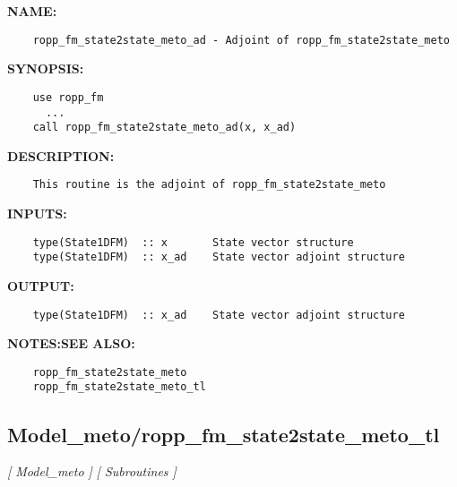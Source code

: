 \label{ch:robo62}
\label{ch:Model_meto_ropp_fm_state2state_meto_ad}
\textbf{NAME:}\hspace{0.08in}\begin{Verbatim}
    ropp_fm_state2state_meto_ad - Adjoint of ropp_fm_state2state_meto
\end{Verbatim}
\textbf{SYNOPSIS:}\hspace{0.08in}\begin{Verbatim}
    use ropp_fm
      ...
    call ropp_fm_state2state_meto_ad(x, x_ad)
\end{Verbatim}
\textbf{DESCRIPTION:}\hspace{0.08in}\begin{Verbatim}
    This routine is the adjoint of ropp_fm_state2state_meto
\end{Verbatim}
\textbf{INPUTS:}\hspace{0.08in}\begin{Verbatim}
    type(State1DFM)  :: x       State vector structure
    type(State1DFM)  :: x_ad    State vector adjoint structure
\end{Verbatim}
\textbf{OUTPUT:}\hspace{0.08in}\begin{Verbatim}
    type(State1DFM)  :: x_ad    State vector adjoint structure
\end{Verbatim}
\textbf{NOTES:}\hspace{0.08in}\textbf{SEE ALSO:}\hspace{0.08in}\begin{Verbatim}
    ropp_fm_state2state_meto
    ropp_fm_state2state_meto_tl
\end{Verbatim}
\subsection{Model\_meto/ropp\_fm\_state2state\_meto\_tl}
\textsl{[ Model\_meto ]}
\textsl{[ Subroutines ]}

